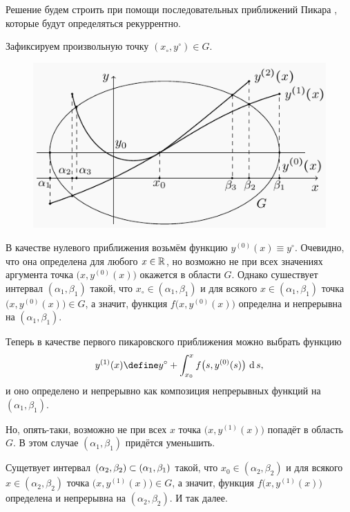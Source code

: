 Решение будем строить при помощи последовательных приближений Пикара , которые будут определяться рекуррентно.

Зафиксируем произвольную точку $ (x_\circ, y^\circ) \in G $.

\begin{figure}[!ht]
    \centering
	\includegraphics{pikar_approximations}
\end{figure}

В качестве нулевого приближения возьмём функцию $ y^{(0)}(x) \equiv y^\circ $. Очевидно, что она определена для любого $ x \in \mathbb{R} $, но возможно не при всех значениях аргумента точка $ \big( x, y^{(0)}(x) \big) $ окажется в области $ G $. Однако сушествует интервал $ (\alpha_1, \beta_1) $ такой, что $ x_\circ \in (\alpha_1, \beta_1) $ и для всякого $ x \in (\alpha_1, \beta_1) $ точка $ \big( x, y^{(0)}(x) \big) \in G $, а значит, функция $ f \big( x, y^{(0)}(x) \big) $ определна и непрерывна на $ (\alpha_1, \beta_1) $.

Теперь в качестве первого пикаровского приближения можно выбрать функцию
$$ y^{(1)}(x) \define y^\circ + \dint[s]{x_0}x{f \big( s, y^{(0)}(s) \big)}, $$
и оно определено и непрерывно как композиция непрерывных функций на $ (\alpha_1, \beta_1) $.

Но, опять-таки, возможно не при всех $ x $ точка $ \big( x, y^{(1)}(x) \big) $ попадёт в область $ G $. В этом случае $ (\alpha_1, \beta_1) $ придётся уменьшить.

Сущетвует интервал $ (\alpha_2, \beta_2) \subset (\alpha_1, \beta_1) $ такой, что $ x_0 \in (\alpha_2, \beta_2) $ и для всякого $ x \in (\alpha_2, \beta_2) $ точка $ \big( x, y^{(1)}(x) \big) \in G $, а значит, функция $ f \big( x, y^{(1)}(x) \big) $ определена и непрерывна на $ (\alpha_2, \beta_2) $. И так далее.

\begin{center}
	\widedots[10cm]
\end{center}

